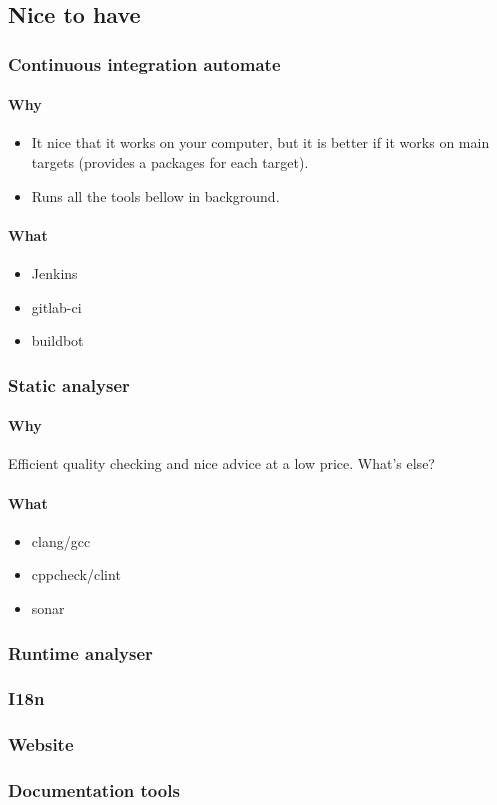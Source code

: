 \documentclass[a4paper, 12pt, twoside, openright]{article}
\begin{document}
  \subsection{Nice to have}

  \subsubsection{Continuous integration automate}

  \paragraph{Why}

  \begin{itemize}
    \item It nice that it works on your computer, but it is better if it works on main targets (provides a packages for each target).
    \item Runs all the tools bellow in background.
  \end{itemize}
  

  \paragraph{What}
  \begin{itemize}
    \item Jenkins
    \item gitlab-ci
    \item buildbot
  \end{itemize}


  \subsubsection{Static analyser }
  \paragraph{Why}
  
  Efficient quality checking and nice advice at a low price. What's else?

  \paragraph{What}

  \begin{itemize}
    \item clang/gcc
    \item cppcheck/clint
    \item sonar
  \end{itemize}

  \subsubsection{Runtime analyser}

  

  \subsubsection{I18n}
  \subsubsection{Website}
  \subsubsection{Documentation tools}
  
\end{document}
